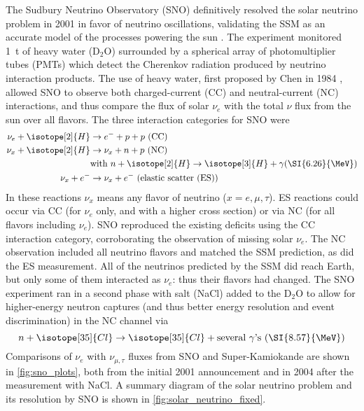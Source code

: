 The Sudbury Neutrino Observatory (SNO) definitively resolved
the solar neutrino problem in 2001 in favor of neutrino oscillations,
validating the SSM as an accurate model of the processes powering the sun
\cite{sno2001}.
The experiment monitored \SI{1}{\tonne} of heavy water ($\text{D}_2\text{O}$)
surrounded by a spherical array of photomultiplier tubes (PMTs)
which detect the Cherenkov radiation produced by neutrino interaction products.
The use of heavy water, first proposed by Chen in 1984 \cite[Ref.\ 15 of][]{chen_d2o},
allowed SNO to observe both charged-current (CC)
and neutral-current (NC) interactions,
and thus compare the flux of solar $\nu_e$ with the total $\nu$ flux
from the sun over all flavors.
The three interaction categories for SNO were
\begin{align}\label{eq:sno_interactions}
    \begin{split}
        \nu_e + \isotope[2]{H} & \to e^- + p + p \text{ (CC)} \\
        \nu_x + \isotope[2]{H} & \to \nu_x + n + p  \text{ (NC)}\\
                               & \text{with }n + \isotope[2]{H} \to
                               \isotope[3]{H} + \gamma (\SI{6.26}{\MeV}) \\
        \nu_x + e^- & \to \nu_x + e^- \text{ (elastic scatter (ES))}
    \end{split}
\end{align}
In these reactions $\nu_x$ means any flavor of neutrino ($x = e,\mu,\tau$).
ES reactions could occur via CC (for $\nu_e$ only, and with a higher cross section)
or via NC (for all flavors including $\nu_e$).
SNO reproduced the existing deficits using the CC interaction category,
corroborating the observation of missing solar $\nu_e$.
The NC observation included all neutrino flavors and matched the SSM prediction,
as did the ES measurement.
All of the neutrinos predicted by the SSM did reach Earth,
but only some of them interacted as $\nu_e$: thus their flavors had changed.
The SNO experiment ran in a second phase
with salt (NaCl) added to the $\text{D}_2\text{O}$
to allow for higher-energy neutron captures
(and thus better energy resolution and event discrimination)
in the NC channel via \cite{sno_salt2004,neutrino_textbook}
\begin{equation}\label{eq:sno_salt}
    n + \isotope[35]{Cl} \to \isotope[35]{Cl} + \text{several }\gamma\text{'s }
    (\SI{8.57}{\MeV})
\end{equation}
Comparisons of $\nu_e$ with $\nu_{\mu,\tau}$ fluxes
from SNO and Super-Kamiokande are shown in \cref{fig:sno_plots},
both from the initial 2001 announcement
and in 2004 after the measurement with NaCl.
A summary diagram of the solar neutrino problem and its resolution by SNO
is shown in \cref{fig:solar_neutrino_fixed}.

